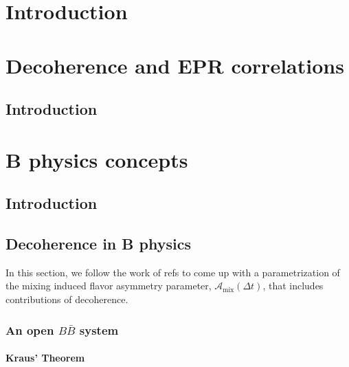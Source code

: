 
\chapter{Introduction}

\chapter{Decoherence and EPR correlations}
\section{Introduction}

\chapter{B physics concepts}
\section{Introduction}

\section{Decoherence in B physics}

In this section, we follow the work of refs \cite{ALOK, Naikoo} to come up with a parametrization of the mixing induced flavor asymmetry parameter, $\mathcal{A}_\text{mix}(\Delta t)$, that includes contributions of decoherence.

\subsection{An open $B\bar{B}$ system}

\subsubsection{Kraus' Theorem}

